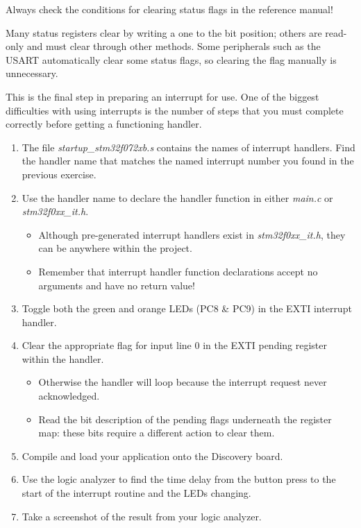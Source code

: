 \documentclass[openany,11pt,fleqn]{book} %
\begin{document}
\begin{warning}
    Always check the conditions for clearing status flags in the reference manual!
    
    Many status registers clear by writing a one to the bit position; others are read-only and must clear through other methods. Some peripherals such as the USART automatically clear some status flags, so clearing the flag manually is unnecessary.
\end{warning}

\begin{exercise}
    \label{ex5}
    This is the final step in preparing an interrupt for use. One of the biggest difficulties with using interrupts is the number of steps that you must complete correctly before getting a functioning handler.
    
    \begin{enumerate}
        \item The file \textit{startup\_stm32f072xb.s} contains the names of interrupt handlers. Find the handler name that matches the named interrupt number you found in the previous exercise. 
        \item Use the handler name to declare the handler function in either \textit{main.c} or \textit{stm32f0xx\_it.h}.
        \begin{itemize}
            \item Although pre-generated interrupt handlers exist in \textit{stm32f0xx\_it.h}, they can be anywhere within the project. 
            \item Remember that interrupt handler function declarations accept no arguments and have no return value! 
        \end{itemize}
        \item Toggle both the green and orange LEDs (PC8 \& PC9) in the EXTI interrupt handler. 
        \item Clear the appropriate flag for input line 0 in the EXTI pending register within the handler.
        \begin{itemize}
            \item Otherwise the handler will loop because the interrupt request never acknowledged.
            \item Read the bit description of the pending flags underneath the register map: these bits require a different action to clear them.
        \end{itemize}
        \item Compile and load your application onto the Discovery board.
        \item Use the logic analyzer to find the time delay from the button press to the start of the interrupt routine and the LEDs changing.
        \item Take a screenshot of the result from your logic analyzer.
    \end{enumerate}
    

\end{exercise}
\end{document}
